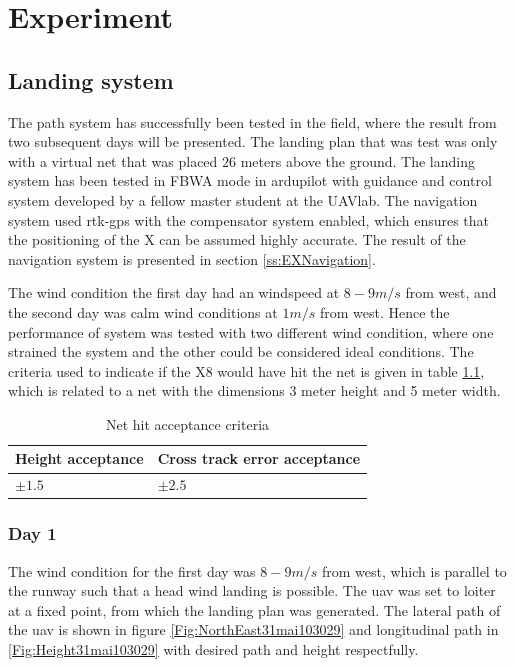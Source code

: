 \chapter{Experiment}
\section{Landing system}
The path system has successfully been tested in the field, where the result from two subsequent days will be presented. The landing plan that was test was only with a virtual net that was placed $26$ meters above the ground. The landing system has been tested in FBWA mode in ardupilot with guidance and control system developed by a fellow master student at the UAVlab. The navigation system used \gls{rtk-gps} with the compensator system enabled, which ensures that the positioning of the X can be assumed highly accurate. The result of the navigation system is presented in section \ref{ss:EXNavigation}.

The wind condition the first day had an windspeed at $8-9 m/s$ from west, and the second day was calm wind conditions at $1 m/s$ from west. Hence the performance of system was tested with two different wind condition, where one strained the system and the other could be considered ideal conditions. The criteria used to indicate if the X8 would have hit the net is given in table \ref{tb:NetCriteria}, which is related to a net with the dimensions 3 meter height and 5 meter width.
\begin{table}[H]
\centering
\begin{tabular}{| l | l |}
\hline
\textbf{Height acceptance}	& \textbf{Cross track error acceptance}	\\ \hline
$\pm1.5$					& $\pm2.5$								\\ \hline
\end{tabular}
\caption{Net hit acceptance criteria}
\label{tb:NetCriteria}
\end{table} 
\newpage
\subsection{Day 1}
The wind condition for the first day was $8-9 m/s$ from west, which is parallel to the runway such that a head wind landing is possible. The \gls{uav} was set to loiter at a fixed point, from which the landing plan was generated. The lateral path of the \gls{uav} is shown in figure \ref{Fig:NorthEast31mai103029} and longitudinal path in \ref{Fig:Height31mai103029} with desired path and height respectfully.

